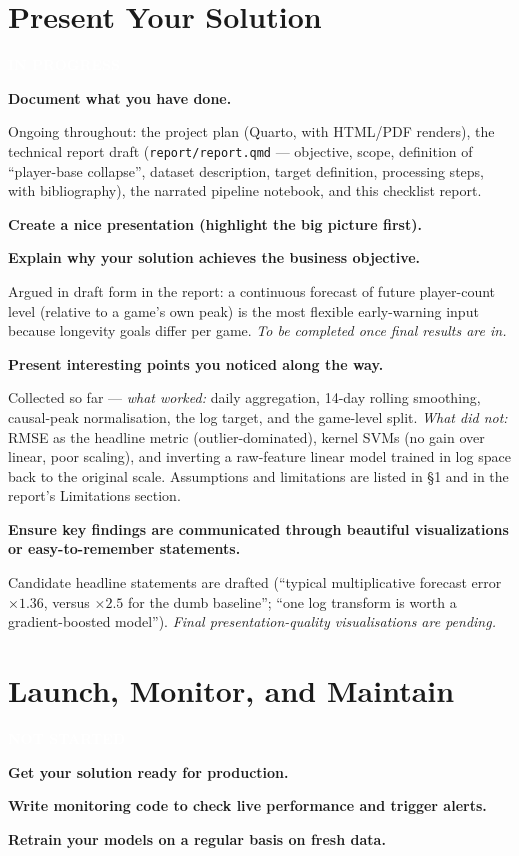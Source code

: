 \documentclass[11pt,a4paper]{article}
\newcommand{\StatusBadge}[2]{\colorbox{#1}{\textcolor{white}{\sffamily\bfseries\footnotesize\;#2\;}}}
\newcommand{\SectionStatus}[2]{\noindent\StatusBadge{#1}{#2}\par\medskip}
\newcommand{\chk}[1]{\item \textbf{#1}\par\nopagebreak\vspace{0.15em}}
\newcommand{\pending}[1][Not yet addressed.]{\textcolor{sttodo}{\itshape #1}}
\newcommand{\blankanswer}{\vspace{2.8em}}   %
\begin{document}
\section{Present Your Solution}
\SectionStatus{stwip}{IN PROGRESS}

\begin{checklist}

\chk{Document what you have done.}
Ongoing throughout: the project plan (Quarto, with HTML/PDF renders), the
technical report draft (\texttt{report/report.qmd} --- objective, scope,
definition of ``player-base collapse'', dataset description, target
definition, processing steps, with bibliography), the narrated pipeline
notebook, and this checklist report.

\chk{Create a nice presentation (highlight the big picture first).}
\blankanswer

\chk{Explain why your solution achieves the business objective.}
Argued in draft form in the report: a continuous forecast of future
player-count level (relative to a game's own peak) is the most flexible
early-warning input because longevity goals differ per game.
\pending[To be completed once final results are in.]

\chk{Present interesting points you noticed along the way.}
Collected so far --- \emph{what worked:} daily aggregation, 14-day rolling
smoothing, causal-peak normalisation, the log target, and the game-level
split. \emph{What did not:} RMSE as the headline metric (outlier-dominated),
kernel SVMs (no gain over linear, poor scaling), and inverting a
raw-feature linear model trained in log space back to the original scale.
Assumptions and limitations are listed in \S1 and in the report's
Limitations section.

\chk{Ensure key findings are communicated through beautiful visualizations or easy-to-remember statements.}
Candidate headline statements are drafted (``typical multiplicative
forecast error $\times 1.36$, versus $\times 2.5$ for the dumb baseline'';
``one log transform is worth a gradient-boosted model'').
\pending[Final presentation-quality visualisations are pending.]

\end{checklist}

\section{Launch, Monitor, and Maintain}
\SectionStatus{sttodo}{NOT STARTED}

\begin{checklist}

\chk{Get your solution ready for production.}
\blankanswer

\chk{Write monitoring code to check live performance and trigger alerts.}
\blankanswer

\chk{Retrain your models on a regular basis on fresh data.}
\blankanswer

\end{checklist}
\end{document}
